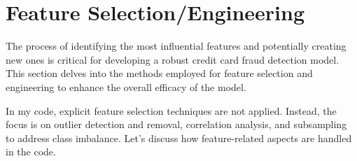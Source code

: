 \section{Feature Selection/Engineering}

The process of identifying the most influential features and potentially creating new ones is critical for developing a robust credit card fraud detection model. This section delves into the methods employed for feature selection and engineering to enhance the overall efficacy of the model.\medskip

In my code, explicit feature selection techniques are not applied. Instead, the focus is on outlier detection and removal, correlation analysis, and subsampling to address class imbalance. Let's discuss how feature-related aspects are handled in the code.

